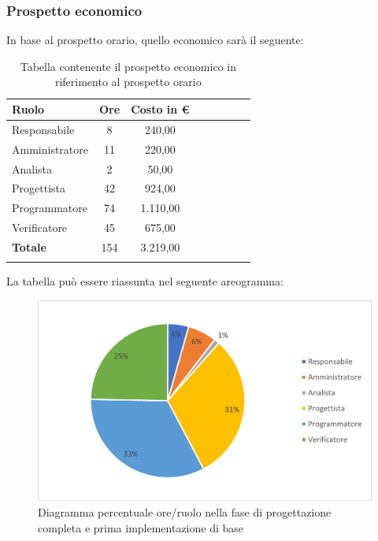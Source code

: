 			\subsubsection{Prospetto economico}
			In base al prospetto orario, quello economico sarà il seguente: 
			
			\begin{longtable}{|l|c|c|c|c|c|c|c|}
				\hline
				\rowcolor{lighter-grayer}
				\textbf{Ruolo} & \textbf{Ore} & \textbf{Costo in €} \\
				\hline
				\endfirsthead
				
				\hline
				Responsabile & 8 & 240,00\\
				\hline
				\hline
				Amministratore & 11 & 220,00\\
				\hline
				\hline
				Analista & 2 & 50,00\\
				\hline
				\hline
				Progettista & 42 & 924,00\\
				\hline
				\hline
				Programmatore & 74 & 1.110,00\\
				\hline
				\hline
				Verificatore & 45 & 675,00\\
				\hline
				\hline
				\textbf{Totale} & 154 & 3.219,00\\
				\hline
				\rowcolor{white}
				\caption{Tabella contenente il prospetto economico in riferimento al prospetto orario}
			\end{longtable}
			\pagebreak
		
			La tabella può essere riassunta nel seguente areogramma:
			\begin{figure}[H]
				\centering
				\includegraphics[width=0.8\linewidth]{res/images/preventivo/5-2.png}
				\caption{Diagramma percentuale ore/ruolo nella fase di progettazione completa e prima implementazione di base}
				\label{fig:diagramma costi ruolo fase progettazione completa e prima implementazione di base}
            \end{figure}

